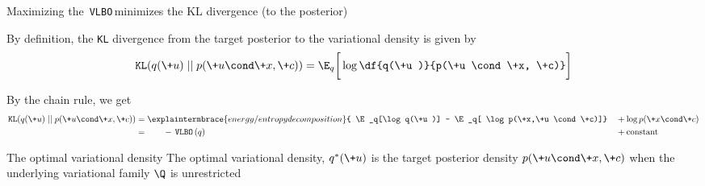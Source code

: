 \documentclass[10pt]{beamer}
\newcommand{\VLBO}{\,\texttt{VLBO}\,}
\begin{document}
\begin{frame}{Maximizing the \VLBO minimizes the KL divergence \tiny (to the posterior)}  


By definition, the \texttt{KL} divergence from the target posterior to the variational density is given by
\begin{equation*}
\texttt{KL} (q(\+u) \; || \; p(\+u \cond \+x, \+c)) =  \E_q \bigg[\log \df{q(\+u )}{p(\+u \cond \+x, \+c)} \bigg] 
\end{equation*}

 


By the chain rule, we get 
\begin{align*} 
 \texttt{KL} (q(\+u) \; || \; p(\+u \cond \+x, \+c)) & = \explaintermbrace{energy/entropy decomposition}{ \E_q[\log q(\+u )]  - \E_q[ \log p(\+x,\+u \cond \+c)]} &&+\log p(\+x \cond \+c) \\
 & = \hphantom{blah} -\VLBO(q)  && +  \text{constant} 
 \end{align*}
 

\begin{block}{The optimal variational density}
The optimal variational density, $q^*(\+u)$ is the target posterior density $p(\+u \cond \+x, \+c)$ when the underlying variational family $\Q$ is unrestricted  
\end{block}

\end{frame}






%
%
%
\end{document}
